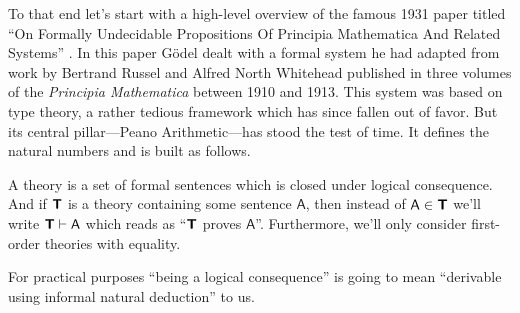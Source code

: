 \documentclass{article}
\theoremstyle{customstyle}
\newcommand{\fm}[1]{\mathsf{#1}}
\newcommand{\T}{\textbf{\textsf{T}}}
\begin{document}
To that end let's start with a high-level overview of the famous 1931 paper titled ``On Formally Undecidable Propositions Of Principia Mathematica And Related Systems'' \cite{goedel}. In this paper Gödel dealt with a formal system he had adapted from work by Bertrand Russel and Alfred North Whitehead published in three volumes of the \emph{Principia Mathematica} between 1910 and 1913. This system was based on type theory, a rather tedious framework which has since fallen out of favor. But its central pillar---Peano Arithmetic---has stood the test of time. It defines the natural numbers and is built as follows.

\begin{definition}[Theory]
  A theory is a set of formal sentences which is closed under logical consequence. And if $\T$ is a theory containing some sentence $\fm{A}$, then instead of $\fm{A} \in \T$ we'll write $\T \vdash \fm{A}$ which reads as ``$\T$ proves $\fm{A}$''. Furthermore, we'll only consider first-order theories with equality.
\end{definition}

For practical purposes ``being a logical consequence'' is going to mean ``derivable using informal natural deduction'' to us.
\end{document}
